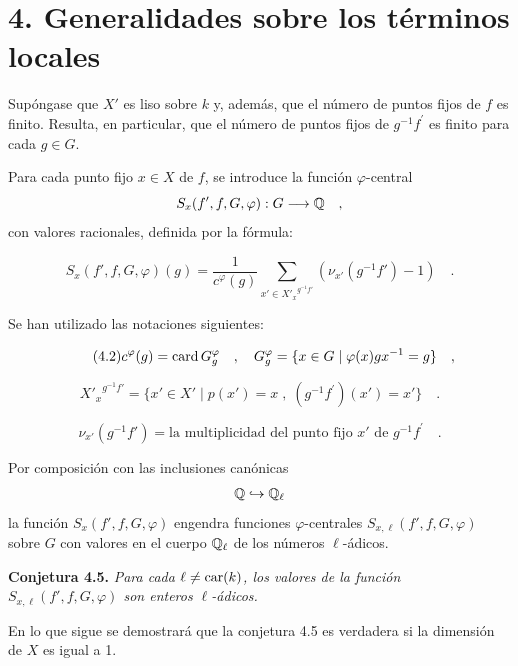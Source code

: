 \section*{4. Generalidades sobre los términos locales}

Supóngase que $X'$ es liso sobre $k$ y, además, que el número de puntos fijos de $f$ es finito. Resulta, en particular, que el número de puntos fijos de $g^{-1}f^{\prime}$ es finito para cada $g \in G$.

Para cada punto fijo $x \in X$ de $f$, se introduce la función $\varphi$-central
\[
S_x(f',f,G,\varphi) : G \longrightarrow \mathbb Q \quad ,
\]
con valores racionales, definida por la fórmula:

\begin{equation}\tag{4.1}
S_x(f',f,G,\varphi)(g) = \frac{1}{c^\varphi(g)} \sum_{x' \in {X'_x}^{g^{-1}f'}} (\nu_{x'}(g^{-1}f') - 1) \quad .
\end{equation}

Se han utilizado las notaciones siguientes:

\begin{equation}\tag{4.2}
c^\varphi(g) = \operatorname{card} G_g^\varphi \quad , \quad G_g^\varphi = \{ x \in G \mid \varphi(x)gx^{-1} = g \} \quad ,
\end{equation}

\begin{equation}\tag{4.3}
{X'_x}^{g^{-1}f'} = \{ x' \in X' \mid p(x') = x \; , \; (g^{-1}f^{\prime})(x') = x' \} \quad .
\end{equation}

\begin{equation}\tag{4.4}
\nu_{x'}(g^{-1}f') = \text{la multiplicidad del punto fijo } x' \text{ de } g^{-1}f^{\prime} \quad .
\end{equation}

Por composición con las inclusiones canónicas
\[
\mathbb Q \hookrightarrow \mathbb Q_\ell
\]
la función $S_x(f',f,G,\varphi)$ engendra funciones $\varphi$-centrales $S_{x,\ell}(f',f,G,\varphi)$ sobre $G$ con valores en el cuerpo $\mathbb Q_\ell$ de los números $\ell$-ádicos.

\medskip
\noindent
\textbf{Conjetura 4.5.} \emph{Para cada $\ell \neq \operatorname{car}(k)$, los valores de la función $S_{x,\ell}(f',f,G,\varphi)$ son enteros $\ell$-ádicos.}

\medskip

En lo que sigue se demostrará que la conjetura 4.5 es verdadera si la dimensión de $X$ es igual a 1.
